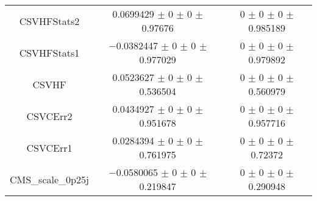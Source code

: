 \begin{table}
\begin{tabular}{ccc}
CSVHFStats2 	& \num{0.0699429} $\pm$ \num{0} $\pm$ \num{0} $\pm$ \num{0.97676} 	& \num{0} $\pm$ \num{0} $\pm$ \num{0} $\pm$ \num{0.985189}\\
CSVHFStats1 	& \num{-0.0382447} $\pm$ \num{0} $\pm$ \num{0} $\pm$ \num{0.977029} 	& \num{0} $\pm$ \num{0} $\pm$ \num{0} $\pm$ \num{0.979892}\\
CSVHF 	& \num{0.0523627} $\pm$ \num{0} $\pm$ \num{0} $\pm$ \num{0.536504} 	& \num{0} $\pm$ \num{0} $\pm$ \num{0} $\pm$ \num{0.560979}\\
CSVCErr2 	& \num{0.0434927} $\pm$ \num{0} $\pm$ \num{0} $\pm$ \num{0.951678} 	& \num{0} $\pm$ \num{0} $\pm$ \num{0} $\pm$ \num{0.957716}\\
CSVCErr1 	& \num{0.0284394} $\pm$ \num{0} $\pm$ \num{0} $\pm$ \num{0.761975} 	& \num{0} $\pm$ \num{0} $\pm$ \num{0} $\pm$ \num{0.72372}\\
CMS\_scale\_0p25j 	& \num{-0.0580065} $\pm$ \num{0} $\pm$ \num{0} $\pm$ \num{0.219847} 	& \num{0} $\pm$ \num{0} $\pm$ \num{0} $\pm$ \num{0.290948}\\
\bottomrule
\end{tabular}
\end{table}